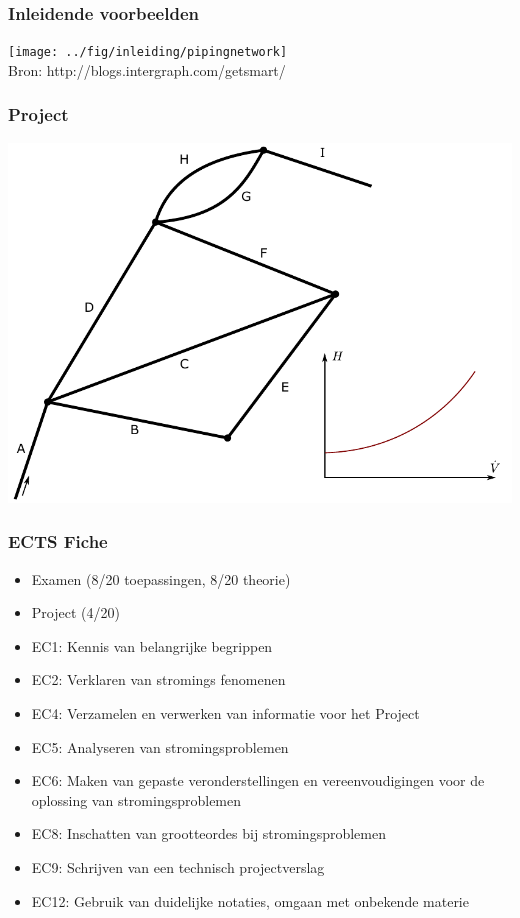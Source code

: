 \documentclass[t]{beamer}
\begin{document}
	\begin{frame}
		\frametitle{Inleidende voorbeelden}
		\center
    	\texttt{[image: ../fig/inleiding/pipingnetwork]}\\
    	\footnotesize{Bron: http://blogs.intergraph.com/getsmart/}
  	\end{frame}
	\begin{frame}
		\frametitle{Project}
		\center
    	\includegraphics[height=0.8\textheight]{../fig/inleiding/project_leigingkarakteristiek}\\
  	\end{frame}  	
	\begin{frame}
		\frametitle{ECTS Fiche}
		\begin{itemize}
			\item Examen (8/20 toepassingen, 8/20 theorie)
			\item Project (4/20)
		\end{itemize}
		\begin{itemize}
			\item EC1: Kennis van belangrijke begrippen
			\item EC2: Verklaren van stromings fenomenen
			\item EC4: Verzamelen en verwerken van informatie voor het Project
			\item EC5: Analyseren van stromingsproblemen
			\item EC6: Maken van gepaste veronderstellingen en vereenvoudigingen voor de oplossing van stromingsproblemen
			\item EC8: Inschatten van grootteordes bij stromingsproblemen
			\item EC9: Schrijven van een technisch projectverslag
			\item EC12: Gebruik van duidelijke notaties, omgaan met onbekende materie		
		\end{itemize}
  	\end{frame}
\end{document}
